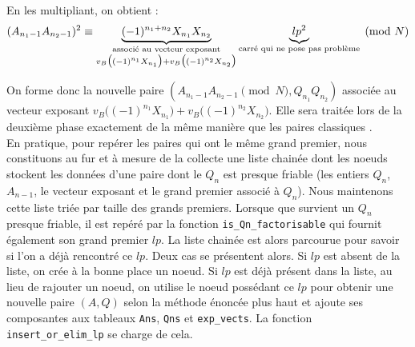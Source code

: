 En les multipliant, on obtient : 
\[  (A_{n_1 -1} A_{n_2 -1})^2 \equiv 
     \underbrace{(-1)^{n_1 + n_2} X_{n_1} X_{n_2}}_
            {\begin{subarray}{c}\text{associé au vecteur exposant}\\
             v_{B} \big( (-1 )^{n_1} X_{n_1} \big)
             + v_{B} \big( (-1 )^{n_2} X_{n_2} \big) \end{subarray}
             }
    \underbrace{lp^2}_{\text{carré qui ne pose pas problème}}
    \pmod{N}
 \]
  
On forme donc la nouvelle paire $ (A_{n_1-1}A_{n_2 -1} \pmod{N}, Q_{n_1}Q_{n_2}) $
associée au vecteur exposant $v_{B} \big( (-1 )^{n_1} X_{n_1} \big)+
v_{B} \big( (-1 )^{n_2} X_{n_2} \big) $.  Elle sera traitée lors de la 
deuxième phase exactement de la même manière que les paires \og classiques \fg{}.\\

En pratique, pour repérer les paires qui ont le même grand premier, nous
constituons au fur et à mesure de la collecte une liste chainée dont les noeuds
stockent les données d'une paire dont le $Q_n$ est presque friable (les entiers
$Q_n$, $A_{n-1}$, le vecteur exposant et le grand premier associé à $Q_n$). Nous
maintenons cette liste triée par taille des grands premiers. Lorsque que survient
un $Q_n$ presque friable, il est repéré par la fonction
\texttt{is\_Qn\_factorisable} qui fournit également son grand premier $lp$. La 
liste chainée est alors parcourue pour savoir si l'on a déjà rencontré ce $lp$.
Deux cas se présentent alors. Si $lp$ est absent de la liste, on crée à la bonne
place un noeud. Si $lp$ est déjà présent dans la liste, au lieu de rajouter un
noeud, on utilise le noeud possédant ce $lp$ pour obtenir une nouvelle paire
$(A,Q)$ selon la méthode énoncée plus haut et ajoute ses composantes aux tableaux
\texttt{Ans}, \texttt{Qns} et \texttt{exp\_vects}. La fonction
\texttt{insert\_or\_elim\_lp} se charge de cela. \\




